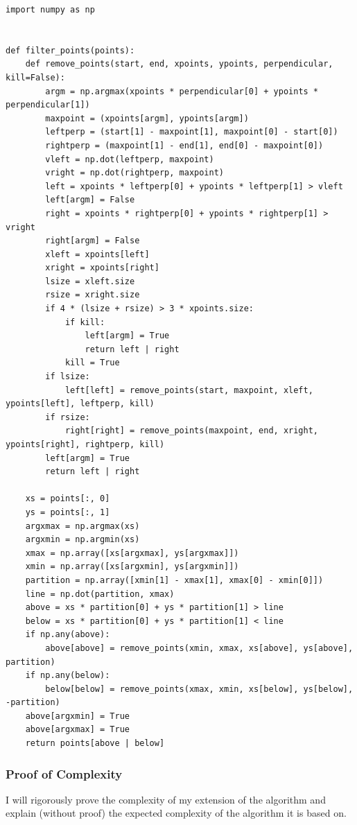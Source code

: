 \documentclass[10pt,\jkfside,a4paper]{article}
\begin{document}
\begin{enumerate}
\begin{lstlisting}[style=py]
import numpy as np


def filter_points(points):
    def remove_points(start, end, xpoints, ypoints, perpendicular, kill=False):
        argm = np.argmax(xpoints * perpendicular[0] + ypoints * perpendicular[1])
        maxpoint = (xpoints[argm], ypoints[argm])
        leftperp = (start[1] - maxpoint[1], maxpoint[0] - start[0])
        rightperp = (maxpoint[1] - end[1], end[0] - maxpoint[0])
        vleft = np.dot(leftperp, maxpoint)
        vright = np.dot(rightperp, maxpoint)
        left = xpoints * leftperp[0] + ypoints * leftperp[1] > vleft
        left[argm] = False
        right = xpoints * rightperp[0] + ypoints * rightperp[1] > vright
        right[argm] = False
        xleft = xpoints[left]
        xright = xpoints[right]
        lsize = xleft.size
        rsize = xright.size
        if 4 * (lsize + rsize) > 3 * xpoints.size:
            if kill:
                left[argm] = True
                return left | right
            kill = True
        if lsize:
            left[left] = remove_points(start, maxpoint, xleft, ypoints[left], leftperp, kill)
        if rsize:
            right[right] = remove_points(maxpoint, end, xright, ypoints[right], rightperp, kill)
        left[argm] = True
        return left | right

    xs = points[:, 0]
    ys = points[:, 1]
    argxmax = np.argmax(xs)
    argxmin = np.argmin(xs)
    xmax = np.array([xs[argxmax], ys[argxmax]])
    xmin = np.array([xs[argxmin], ys[argxmin]])
    partition = np.array([xmin[1] - xmax[1], xmax[0] - xmin[0]])
    line = np.dot(partition, xmax)
    above = xs * partition[0] + ys * partition[1] > line
    below = xs * partition[0] + ys * partition[1] < line
    if np.any(above):
        above[above] = remove_points(xmin, xmax, xs[above], ys[above], partition)
    if np.any(below):
        below[below] = remove_points(xmax, xmin, xs[below], ys[below], -partition)
    above[argxmin] = True
    above[argxmax] = True
    return points[above | below]
\end{lstlisting}

\subsubsection*{Proof of Complexity}

I will rigorously prove the complexity of my extension of the algorithm and explain 
(without proof) the expected complexity of the algorithm it is based on. 


\end{enumerate}
\end{document}

